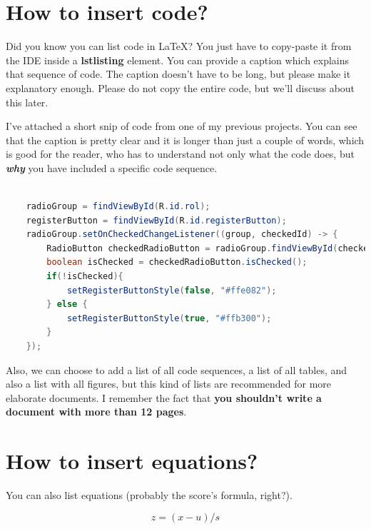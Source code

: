 \section{How to insert code?}

Did you know you can list code in \LaTeX{}? You just have to copy-paste it from the IDE inside a \textbf{lstlisting} element. You can provide a caption which explains that sequence of code. The caption doesn't have to be long, but please make it explanatory enough. Please do not copy the entire code, but we'll discuss about this later.

I've attached a short snip of code from one of my previous projects. You can see that the caption is pretty clear and it is longer than just a couple of words, which is good for the reader, who has to understand not only what the code does, but \textbf{\textit{why}} you have included a specific code sequence. 

\begin{lstlisting}[caption={Checking if the user has selected the role in the application checking a radioButton according to his role (doctor or patient). If any radioButton has been selected, the register button changes is colour and becomes enabled.}, language=Java]
    
    radioGroup = findViewById(R.id.rol);
    registerButton = findViewById(R.id.registerButton);
    radioGroup.setOnCheckedChangeListener((group, checkedId) -> {
        RadioButton checkedRadioButton = radioGroup.findViewById(checkedId);
        boolean isChecked = checkedRadioButton.isChecked();
        if(!isChecked){
            setRegisterButtonStyle(false, "#ffe082");
        } else {
            setRegisterButtonStyle(true, "#ffb300");
        }
    });
\end{lstlisting}

Also, we can choose to add a list of all code sequences, a list of all tables, and also a list with all figures, but this kind of lists are recommended for more elaborate documents. I remember the fact that \textbf{you shouldn't write a document with more than 12 pages}. 

\section{How to insert equations?}

You can also list equations (probably the score's formula, right?).

\begin{equation}
z = (x - u)/s
\end{equation}

